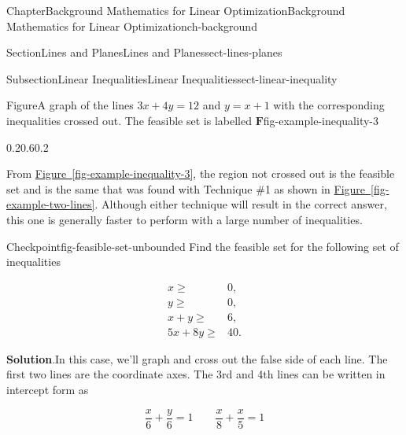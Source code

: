 \documentclass[oneside,10pt,]{book}
\newcommand{\blocktitlefont}{\relax}
\newcommand{\xreffont}{\relax}
\numberwithin{equation}{section}
\newcommand{\amp}{&}
\begin{document}
\begin{chapterptx}{Chapter}{Background Mathematics for Linear Optimization}{}{Background Mathematics for Linear Optimization}{}{}{ch-background}
\begin{sectionptx}{Section}{Lines and Planes}{}{Lines and Planes}{}{}{sect-lines-planes}
\begin{subsectionptx}{Subsection}{Linear Inequalities}{}{Linear Inequalities}{}{}{sect-linear-inequality}
\begin{figureptx}{Figure}{A graph of the lines \(3x+4y=12\) and \(y=x+1\) with the corresponding inequalities crossed out. The feasible set is labelled \(\boldsymbol{F}\)}{fig-example-inequality-3}{}
\begin{image}{0.2}{0.6}{0.2}{}
{%
}%
\end{image}%
\tcblower
\end{figureptx}%
From \hyperref[fig-example-inequality-3]{Figure~{\xreffont\ref{fig-example-inequality-3}}}, the region not crossed out is the feasible set and is the same that was found with Technique \#1 as shown in \hyperref[fig-example-two-lines]{Figure~{\xreffont\ref{fig-example-two-lines}}}. Although either technique will result in the correct answer, this one is generally faster to perform with a large number of inequalities.%
\begin{inlineexercise}{Checkpoint}{}{fig-feasible-set-unbounded}%
Find the feasible set for the following set of inequalities%
\par
%
\begin{align*}
x \geq \amp 0, \\
y \geq \amp 0,\\
x+y \geq \amp 6, \\
5x+8y \geq \amp 40.
\end{align*}
%
\par\smallskip%
\noindent\textbf{\blocktitlefont Solution}.\hypertarget{fig-feasible-set-unbounded-2}{}\quad{}In this case, we'll graph and cross out the false side of each line. The first two lines are the coordinate axes. The 3rd and 4th lines can be written in intercept form as%
\par
%
\begin{equation*}
\frac{x}{6} + \frac{y}{6} = 1 \qquad \frac{x}{8} + \frac{x}{5} = 1
\end{equation*}

\end{inlineexercise}
\end{subsectionptx}
\end{sectionptx}
\end{chapterptx}
\end{document}
